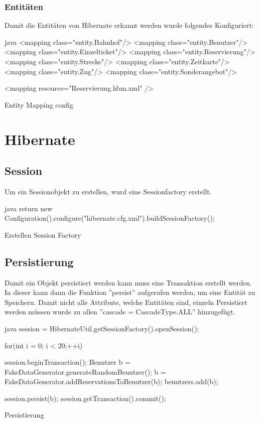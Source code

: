 	\subsubsection{Entitäten}
	
	Damit die Entitäten von Hibernate erkannt werden wurde folgendes Konfiguriert:
	
	\begin{listing}
	\begin{code}[]{java}
		<mapping class="entity.Bahnhof"/>
		<mapping class="entity.Benutzer"/>
		<mapping class="entity.Einzelticket"/>
		<mapping class="entity.Reservierung"/>
		<mapping class="entity.Strecke"/>
		<mapping class="entity.Zeitkarte"/>
		<mapping class="entity.Zug"/>
		<mapping class="entity.Sonderangebot"/>
		
		<mapping resource="Reservierung.hbm.xml" />
	\end{code}
	\caption{Entity Mapping config}
	\end{listing}

	\section{Hibernate}
	\subsection{Session}
	Um ein Sessionobjekt zu erstellen, wurd eine Sessionfactory erstellt.
	
	\begin{listing}
	\begin{code}[]{java}
		return new Configuration().configure("hibernate.cfg.xml").buildSessionFactory();
	\end{code}
	\caption{Erstellen Session Factory}
	\end{listing}

	\subsection{Persistierung}
	Damit ein Objekt persistiert werden kann muss eine Transaktion erstellt werden. In dieser kann dann die Funktion ''persist'' aufgerufen werden, um eine Entität zu Speichern. 
	Damit nicht alle Attribute, welche Entitäten sind, einzeln Persistiert werden müssen wurde zu allen ''cascade = CascadeType.ALL'' hinzugefügt.
	
	\begin{listing}
	\begin{code}[]{java}
		session = HibernateUtil.getSessionFactory().openSession();
		
		for(int i = 0; i < 20;++i) {
			session.beginTransaction();
			Benutzer b = FakeDataGenerator.generateRandomBenutzer();
			b = FakeDataGenerator.addReservationsToBenutzer(b);
			benutzers.add(b);
			
			session.persist(b);
			session.getTransaction().commit();
		}
	\end{code}

	\caption{Persistierung}
	\end{listing}


